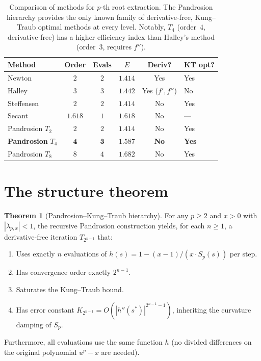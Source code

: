 \documentclass[11pt,a4paper]{article}
\theoremstyle{definition}
\newtheorem{theorem}{Theorem}[section]
\begin{document}
\begin{table}[H]
\centering
\renewcommand{\arraystretch}{1.2}
\begin{tabular}{lccccl}
\toprule
\textbf{Method} & \textbf{Order} & \textbf{Evals} & $E$ & \textbf{Deriv?} & \textbf{KT opt?} \\
\midrule
Newton & $2$ & $2$ & $1.414$ & Yes & Yes \\
Halley & $3$ & $3$ & $1.442$ & Yes ($f',f''$) & No \\
Steffensen & $2$ & $2$ & $1.414$ & No & Yes \\
Secant & $1.618$ & $1$ & $1.618$ & No & --- \\
\midrule
Pandrosion $T_2$ & $2$ & $2$ & $1.414$ & No & Yes \\
\textbf{Pandrosion} $T_4$ & $\mathbf{4}$ & $\mathbf{3}$ & $\mathbf{1.587}$ & \textbf{No} & \textbf{Yes} \\
Pandrosion $T_8$ & $8$ & $4$ & $1.682$ & No & Yes \\
\bottomrule
\end{tabular}
\caption{Comparison of methods for $p$-th root extraction.  The Pandrosion hierarchy provides the only known family of derivative-free, Kung--Traub optimal methods at every level.  Notably, $T_4$ (order~$4$, derivative-free) has a higher efficiency index than Halley's method (order~$3$, requires $f''$).}
\label{tab:comparison}
\end{table}

\section{The structure theorem}
\label{sec:structure}

\begin{theorem}[Pandrosion--Kung--Traub hierarchy]
\label{thm:hierarchy}
For any $p \geq 2$ and $x > 0$ with $|{\lambda_{p,x}}| < 1$, the recursive Pandrosion construction yields, for each $n \geq 1$, a derivative-free iteration $T_{2^{n-1}}$ that:
\begin{enumerate}
  \item Uses exactly $n$ evaluations of $h(s) = 1 - (x-1)/(x \cdot S_p(s))$ per step.
  \item Has convergence order exactly $2^{n-1}$.
  \item Saturates the Kung--Traub bound.
  \item Has error constant $K_{2^{n-1}} = O(|h''(s^*)|^{2^{n-1}-1})$, inheriting the curvature damping of $S_p$.
\end{enumerate}
Furthermore, all evaluations use the same function $h$ (no divided differences on the original polynomial $u^p - x$ are needed).
\end{theorem}
\end{document}

